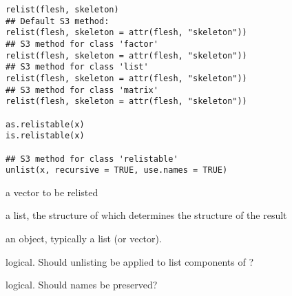 %
\begin{Usage}
\begin{verbatim}
relist(flesh, skeleton)
## Default S3 method:
relist(flesh, skeleton = attr(flesh, "skeleton"))
## S3 method for class 'factor'
relist(flesh, skeleton = attr(flesh, "skeleton"))
## S3 method for class 'list'
relist(flesh, skeleton = attr(flesh, "skeleton"))
## S3 method for class 'matrix'
relist(flesh, skeleton = attr(flesh, "skeleton"))

as.relistable(x)
is.relistable(x)

## S3 method for class 'relistable'
unlist(x, recursive = TRUE, use.names = TRUE)
\end{verbatim}
\end{Usage}
%
\begin{Arguments}
\begin{ldescription}
\item[\code{flesh}] a vector to be relisted
\item[\code{skeleton}] a list, the structure of which determines the structure
of the result
\item[\code{x}] an \R{} object, typically a list (or vector).
\item[\code{recursive}] logical.  Should unlisting be applied to list
components of ?
\item[\code{use.names}] logical.  Should names be preserved?
\end{ldescription}
\end{Arguments}
%
